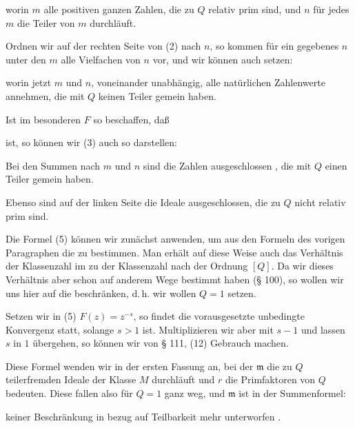 worin $m$ alle positiven ganzen Zahlen, die zu $Q$ relativ prim sind,
und $n$ für jedes $m$ die Teiler von $m$ durchläuft.

Ordnen wir auf der rechten Seite von (2) nach $n$, so kommen
für ein gegebenes $n$ unter den $m$ alle Vielfachen von $n$ vor, und
wir können auch setzen:


worin jetzt $m$ und $n$, voneinander unabhängig, alle natürlichen
Zahlenwerte annehmen, die mit $Q$ keinen Teiler gemein haben.

Ist im besonderen $F$ so beschaffen, daß


ist, so können wir (3) auch so darstellen:


Bei den Summen nach $m$ und $n$ sind die Zahlen ausgeschlossen
, die mit $Q$ einen Teiler gemein haben.

Ebenso sind auf der linken Seite die Ideale ausgeschlossen,
die zu $Q$ nicht relativ prim sind.

Die Formel (5) können wir zunächst anwenden, um aus den
Formeln des vorigen Paragraphen die  zu bestimmen.
Man erhält auf diese Weise auch das Verhältnis der Klassenzahl
im  zu der Klassenzahl nach der Ordnung $[Q]$. Da wir
dieses Verhältnis aber schon auf anderem Wege bestimmt haben
(§ 100), so wollen wir uns hier auf die 
 beschränken, d.\,h. wir wollen $Q = 1$ setzen.

Setzen wir in (5) $F(z) = z^{-s}$, so findet die vorausgesetzte
unbedingte Konvergenz statt, solange $s > 1$ ist. Multiplizieren
wir aber mit $s - 1$ und lassen $s$ in $1$ übergehen, so können wir
von § 111, (12) Gebrauch machen.

Diese Formel wenden wir in der ersten Fassung an, bei
der $\mathfrak{m}$ die zu $Q$ teilerfremden Ideale der Klasse $M$ durchläuft
und $r$ die Primfaktoren von $Q$ bedeuten. Diese fallen also für
$Q = 1$ ganz weg, und $\mathfrak{m}$ ist in der Summenformel:


keiner Beschränkung in bezug auf Teilbarkeit mehr unterworfen
.
